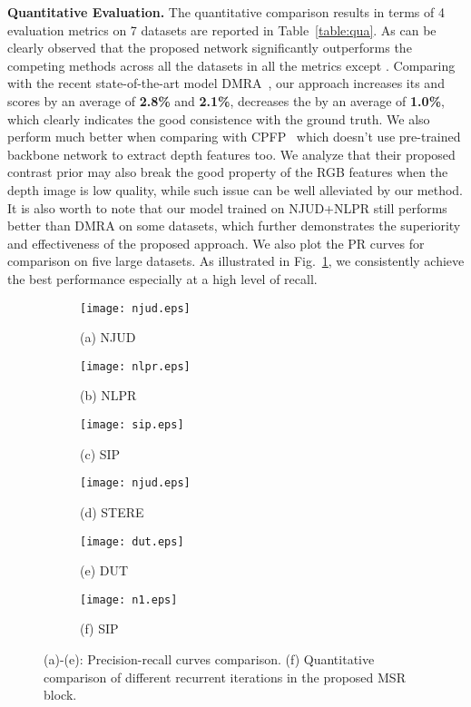 \documentclass[runningheads]{llncs}
\begin{document}
\textbf{Quantitative Evaluation.} The quantitative comparison results in terms of 4 evaluation metrics on 7 datasets are reported in Table~\ref{table:qua}. As can be clearly observed that the proposed network significantly outperforms the competing methods across all the datasets in all the metrics except . Comparing with the recent state-of-the-art model DMRA~\cite{piao2019depth}, our approach increases its  and  scores by an average of \textbf{2.8\%} and \textbf{2.1\%}, decreases the  by an average of \textbf{1.0\%}, which clearly indicates the good consistence with the ground truth. We also perform much better when comparing with CPFP~\cite{zhao2019contrast} which doesn't use pre-trained backbone network to extract depth features too. We analyze that their proposed contrast prior may also break the good property of the RGB features when the depth image is low quality, while such issue can be well alleviated by our method. It is also worth to note that our model trained on NJUD+NLPR still performs better than DMRA on some datasets, which further demonstrates the superiority and effectiveness of the proposed approach. We also plot the PR curves for comparison on five large datasets. As illustrated in Fig.~\ref{fig_pr}, we consistently achieve the best performance especially at a high level of recall.


\begin{figure}[t]
\captionsetup[subfigure]{labelformat=empty}	
	\centering
    \begin{subfigure}[t]{4.0cm}
		\centering
		\texttt{[image: njud.eps]}
		\caption{\scriptsize (a) NJUD~\cite{ju2014depth}}	
	\end{subfigure}
	\begin{subfigure}[t]{4.0cm}
		\centering
		\texttt{[image: nlpr.eps]}
		\caption{\scriptsize (b) NLPR~\cite{peng2014rgbd}}	
	\end{subfigure}
	\begin{subfigure}[t]{4.0cm}
		\centering
		\texttt{[image: sip.eps]}
		\caption{\scriptsize (c) SIP~\cite{fan2019rethinking}}
	\end{subfigure}

    \vspace{1pt}
    
    \begin{subfigure}[t]{4.0cm}
		\centering
		\texttt{[image: njud.eps]}
		\caption{\scriptsize (d) STERE~\cite{niu2012leveraging}}	
	\end{subfigure}
	\begin{subfigure}[t]{4.0cm}
		\centering
		\texttt{[image: dut.eps]}
		\caption{\scriptsize (e) DUT~\cite{piao2019depth}}	
	\end{subfigure}
	\begin{subfigure}[t]{4.0cm}
		\centering
		\texttt{[image: n1.eps]}
		\caption{\scriptsize (f) SIP~\cite{fan2019rethinking}}
	\end{subfigure}

    \caption{(a)-(e): Precision-recall curves comparison. (f) Quantitative comparison of different recurrent iterations in the proposed MSR block.}\label{fig_pr}
\end{figure}
\end{document}
